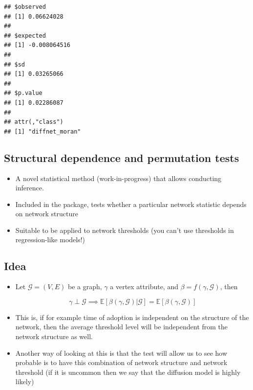 \documentclass[]{book}
\newenvironment{Shaded}{\begin{snugshade}}{\end{snugshade}}
\newcommand{\CommentTok}[1]{\textcolor[rgb]{0.56,0.35,0.01}{\textit{#1}}}
\newcommand{\DecValTok}[1]{\textcolor[rgb]{0.00,0.00,0.81}{#1}}
\newcommand{\KeywordTok}[1]{\textcolor[rgb]{0.13,0.29,0.53}{\textbf{#1}}}
\newcommand{\NormalTok}[1]{#1}
\newcommand{\OperatorTok}[1]{\textcolor[rgb]{0.81,0.36,0.00}{\textbf{#1}}}
\newcommand{\StringTok}[1]{\textcolor[rgb]{0.31,0.60,0.02}{#1}}
\providecommand{\tightlist}{%
  \setlength{\itemsep}{0pt}\setlength{\parskip}{0pt}}
\begin{document}
\begin{itemize}
\begin{Shaded}
\end{Shaded}

\begin{verbatim}
## $observed
## [1] 0.06624028
## 
## $expected
## [1] -0.008064516
## 
## $sd
## [1] 0.03265066
## 
## $p.value
## [1] 0.02286087
## 
## attr(,"class")
## [1] "diffnet_moran"
\end{verbatim}
\end{itemize}

\hypertarget{structural-dependence-and-permutation-tests}{%
\subsection{Structural dependence and permutation tests}\label{structural-dependence-and-permutation-tests}}

\begin{itemize}
\tightlist
\item
  A novel statistical method (work-in-progress) that allows conducting inference.
\item
  Included in the package, tests whether a particular network statistic depends on network structure
\item
  Suitable to be applied to network thresholds (you can't use thresholds in regression-like models!)
\end{itemize}

\hypertarget{idea}{%
\subsection{Idea}\label{idea}}

\begin{itemize}
\item
  Let \(\mathcal{G} = (V,E)\) be a graph, \(\gamma\) a vertex attribute, and \(\beta = f(\gamma,\mathcal{G})\), then

  \[\gamma \perp \mathcal{G} \implies \mathbb{E}\left[\beta(\gamma,\mathcal{G})|\mathcal{G}\right] = \mathbb{E}\left[\beta(\gamma,\mathcal{G})\right]\]
\item
  This is, if for example time of adoption is independent on the structure of the network, then the average threshold level will be independent from the network structure as well.
\item
  Another way of looking at this is that the test will allow us to see how probable is to have this combination of network structure and network threshold (if it is uncommon then we say that the diffusion model is highly likely)
\end{itemize}
\end{document}
